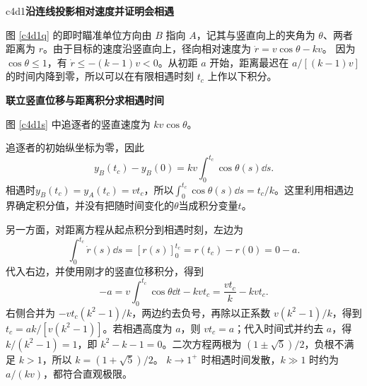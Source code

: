 \LectureAnswerSection

\begin{drillsolution}{c4d1}\textbf{沿连线投影相对速度并证明会相遇}\par\nobreak
图 \ref{c4d1q} 的即时瞄准单位方向由 $B$ 指向 $A$，记其与竖直向上的夹角为 $\theta$、两者距离为 $r$。由于目标的速度沿竖直向上，径向相对速度为
$\dot r=v\cos\theta-kv$。
因为 $\cos\theta\le1$，有 $\dot r\le-(k-1)v<0$。从初距 $a$ 开始，距离最迟在 $a/[(k-1)v]$ 的时间内降到零，所以可以在有限相遇时刻 $t_c$ 上作以下积分。



\par\medskip{}\noindent\textbf{联立竖直位移与距离积分求相遇时间}\par\nobreak
图 \ref{c4d1s} 中追逐者的竖直速度为 $kv\cos\theta$。

追逐者的初始纵坐标为零，因此
\[
y_B(t_c)-y_B(0)=kv\int_0^{t_c}\cos\theta(s)\dd s.
\]
相遇时$y_B(t_c)=y_A(t_c)=vt_c$，所以$\int_0^{t_c}\cos\theta(s)\dd s=t_c/k$。这里利用相遇边界确定积分值，并没有把随时间变化的$\theta$当成积分变量$t$。

另一方面，对距离方程从起点积分到相遇时刻，左边为
\[
\int_0^{t_c}\dot r(s)\dd s=[r(s)]_0^{t_c}=r(t_c)-r(0)=0-a.
\]
代入右边，并使用刚才的竖直位移积分，得到
\[
 -a=v\int_0^{t_c}\cos\theta\dd t-kvt_c
 =\frac{vt_c}{k}-kvt_c.
\]
右侧合并为 $-vt_c(k^2-1)/k$，两边约去负号，再除以正系数 $v(k^2-1)/k$，得到 $\boxed{t_c=ak/[v(k^2-1)]}$。若相遇高度为 $a$，则 $vt_c=a$；代入时间式并约去 $a$，得 $k/(k^2-1)=1$，即 $k^2-k-1=0$。二次方程两根为 $(1\pm\sqrt5)/2$，负根不满足 $k>1$，所以
$\boxed{k=(1+\sqrt5)/2}$。
$k\to1^+$ 时相遇时间发散，$k\gg1$ 时约为 $a/(kv)$，都符合直观极限。

\end{drillsolution}
